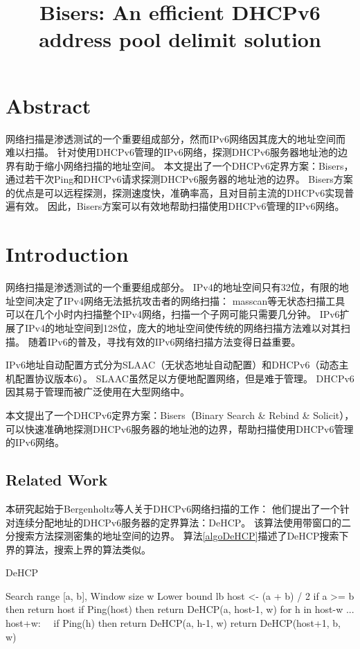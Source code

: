 \documentclass[UTF8]{article}
\begin{document}
\title{Bisers: An efficient DHCPv6 address pool delimit solution}

\section{Abstract}

网络扫描是渗透测试的一个重要组成部分，然而IPv6网络因其庞大的地址空间而难以扫描。
针对使用DHCPv6管理的IPv6网络，探测DHCPv6服务器地址池的边界有助于缩小网络扫描的地址空间。
本文提出了一个DHCPv6定界方案：Bisers，通过若干次Ping和DHCPv6请求探测DHCPv6服务器的地址池的边界。
Bisers方案的优点是可以远程探测，探测速度快，准确率高，且对目前主流的DHCPv6实现普遍有效。
因此，Bisers方案可以有效地帮助扫描使用DHCPv6管理的IPv6网络。

\section{Introduction}

网络扫描是渗透测试的一个重要组成部分。
IPv4的地址空间只有32位，有限的地址空间决定了IPv4网络无法抵抗攻击者的网络扫描：
masscan等无状态扫描工具可以在几个小时内扫描整个IPv4网络，扫描一个子网可能只需要几分钟。
IPv6扩展了IPv4的地址空间到128位，庞大的地址空间使传统的网络扫描方法难以对其扫描。
随着IPv6的普及，寻找有效的IPv6网络扫描方法变得日益重要。

IPv6地址自动配置方式分为SLAAC（无状态地址自动配置）和DHCPv6（动态主机配置协议版本6）。
SLAAC虽然足以方便地配置网络，但是难于管理。
DHCPv6因其易于管理而被广泛使用在大型网络中。

本文提出了一个DHCPv6定界方案：Bisers（Binary Search \& Rebind \& Solicit），
可以快速准确地探测DHCPv6服务器的地址池的边界，帮助扫描使用DHCPv6管理的IPv6网络。

\subsection{Related Work}

本研究起始于Bergenholtz等人关于DHCPv6网络扫描的工作\cite{bergenholtz_finding_2019}：
他们提出了一个针对连续分配地址的DHCPv6服务器的定界算法：DeHCP。
该算法使用带窗口的二分搜索方法探测密集的地址空间的边界。
算法\ref{algoDeHCP}描述了DeHCP搜索下界的算法，搜索上界的算法类似。

\begin{algorithm}[H]
  \caption{DeHCP}
  \label{algoDeHCP}
  \renewcommand{\algorithmicrequire}{\textbf{Input:}}
  \renewcommand{\algorithmicensure}{\textbf{Output:}}
  \begin{algorithmic}[1]
    \REQUIRE Search range [a, b], Window size w
    \ENSURE Lower bound lb
    \STATE host <- (a + b) / 2
    \STATE if a >= b then return host
    \STATE if Ping(host) then return DeHCP(a, host-1, w)
    \STATE for h in host-w ... host+w:
    \STATE \ \ if Ping(h) then return DeHCP(a, h-1, w)
    \STATE return DeHCP(host+1, b, w)
  \end{algorithmic}
\end{algorithm}
\end{document}

